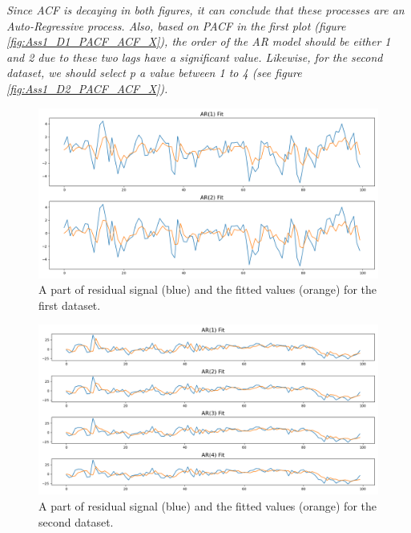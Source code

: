 \textit{Since \gls{ACF} is decaying in both figures, it can conclude that these processes are an Auto-Regressive process. Also, based on \gls{PACF} in the first plot (figure \ref{fig:Ass1_D1_PACF_ACF_X}), the order of the \gls{AR} model should be either 1 and 2 due to these two lags have a significant value. Likewise, for the second dataset, we should select p a value between 1 to 4 (see figure \ref{fig:Ass1_D2_PACF_ACF_X}).}

\begin{figure}[H]
    \centering
    \begin{minipage}[b]{1\textwidth}
        \includegraphics[width=\textwidth]{figures/Ass1/Ass1_D1_ARs models.png}
    \end{minipage}
    \caption{A part of residual signal (blue) and the fitted values (orange) for the first dataset.}
    \label{fig:Ass1_D1_ARs_models}
\end{figure}

\begin{figure}[H]
    \centering
    \begin{minipage}[b]{1\textwidth}
        \includegraphics[width=\textwidth]{figures/Ass1/Ass1_D2_ARs models.png}
    \end{minipage}
    \caption{A part of residual signal (blue) and the fitted values (orange) for the second dataset.}
    \label{fig:Ass1_D2_ARs_models}
\end{figure}


